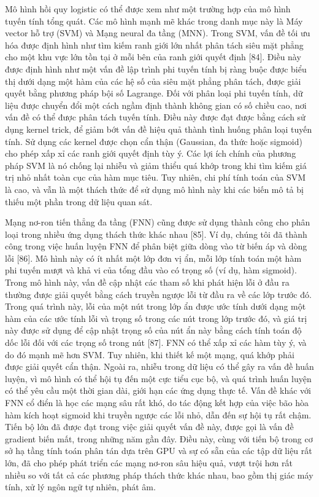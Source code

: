 \documentclass[utf8]{frontiersSCNS} %
\begin{document}
Mô hình hồi quy logistic có thể được xem như một trường hợp của mô hình tuyến tính tổng quát. Các mô hình mạnh mẽ khác trong danh mục này là Máy vector hỗ trợ (SVM) và Mạng neural đa tầng (MNN). Trong SVM, vấn đề tối ưu hóa được định hình như tìm kiếm ranh giới lớn nhất phân tách siêu mặt phẳng cho một khu vực lớn tồn tại ở mỗi bên của ranh giới quyết định [84]. Điều này được định hình như một vấn đề lập trình phi tuyến tính bị ràng buộc được biểu thị dưới dạng một hàm của các hệ số của siêu mặt phẳng phân tách, được giải quyết bằng phương pháp bội số Lagrange. Đối với phân loại phi tuyến tính, dữ liệu được chuyển đổi một cách ngầm định thành không gian có số chiều cao, nơi vấn đề có thể được phân tách tuyến tính. Điều này được đạt được bằng cách sử dụng kernel trick, để giảm bớt vấn đề hiệu quả thành tình huống phân loại tuyến tính. Sử dụng các kernel được chọn cẩn thận (Gaussian, đa thức hoặc sigmoid) cho phép xấp xỉ các ranh giới quyết định tùy ý. Các lợi ích chính của phương pháp SVM là nó chống lại nhiễu và giảm thiểu quá khớp trong khi tìm kiếm giá trị nhỏ nhất toàn cục của hàm mục tiêu. Tuy nhiên, chi phí tính toán của SVM là cao, và vẫn là một thách thức để sử dụng mô hình này khi các biến mô tả bị thiếu một phần trong dữ liệu quan sát.

Mạng nơ-ron tiến thẳng đa tầng (FNN) cũng được sử dụng thành công cho phân loại trong nhiều ứng dụng thách thức khác nhau [85]. Ví dụ, chúng tôi đã thành công trong việc huấn luyện FNN để phân biệt giữa dòng vào từ biến áp và dòng lỗi [86]. Mô hình này có ít nhất một lớp đơn vị ẩn, mỗi lớp tính toán một hàm phi tuyến mượt và khả vi của tổng đầu vào có trọng số (ví dụ, hàm sigmoid). Trong mô hình này, vấn đề cập nhật các tham số khi phát hiện lỗi ở đầu ra thường được giải quyết bằng cách truyền ngược lỗi từ đầu ra về các lớp trước đó. Trong quá trình này, lỗi của một nút trong lớp ẩn được ước tính dưới dạng một hàm của các ước tính lỗi và trọng số trong các nút trong lớp trước đó, và giá trị này được sử dụng để cập nhật trọng số của nút ẩn này bằng cách tính toán độ dốc lỗi đối với các trọng số trong nút [87]. FNN có thể xấp xỉ các hàm tùy ý, và do đó mạnh mẽ hơn SVM. Tuy nhiên, khi thiết kế một mạng, quá khớp phải được giải quyết cẩn thận. Ngoài ra, nhiễu trong dữ liệu có thể gây ra vấn đề huấn luyện, vì mô hình có thể hội tụ đến một cực tiểu cục bộ, và quá trình huấn luyện có thể yêu cầu một thời gian dài, giới hạn các ứng dụng thực tế. Vấn đề khác với FNN cổ điển là học các mạng sâu rất khó, do tác động kết hợp của việc bão hòa hàm kích hoạt sigmoid khi truyền ngược các lỗi nhỏ, dẫn đến sự hội tụ rất chậm. Tiến bộ lớn đã được đạt trong việc giải quyết vấn đề này, được gọi là vấn đề gradient biến mất, trong những năm gần đây. Điều này, cùng với tiến bộ trong cơ sở hạ tầng tính toán phân tán dựa trên GPU và sự có sẵn của các tập dữ liệu rất lớn, đã cho phép phát triển các mạng nơ-ron sâu hiệu quả, vượt trội hơn rất nhiều so với tất cả các phương pháp thách thức khác nhau, bao gồm thị giác máy tính, xử lý ngôn ngữ tự nhiên, phát âm.
\end{document}
